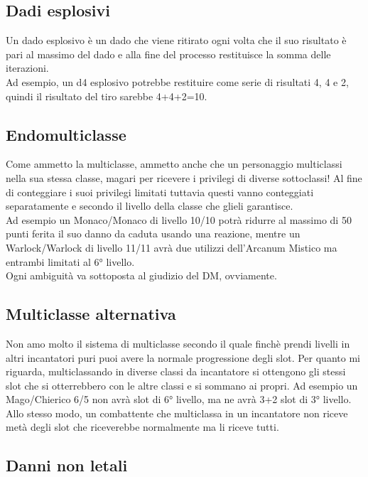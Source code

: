 \subsection{Dadi esplosivi}

Un dado esplosivo è un dado che viene ritirato ogni volta che il suo risultato è pari al massimo del dado e alla fine del processo restituisce la somma delle iterazioni. \\ Ad esempio, un d4 esplosivo potrebbe restituire come serie di risultati 4, 4 e 2, quindi il risultato del tiro sarebbe 4+4+2=10.

\subsection{Endomulticlasse}

Come ammetto la multiclasse, ammetto anche che un personaggio multiclassi nella sua stessa classe, magari per ricevere i privilegi di diverse sottoclassi! Al fine di conteggiare i suoi privilegi limitati tuttavia questi vanno conteggiati separatamente e secondo il livello della classe che glieli garantisce. \\ Ad esempio un Monaco/Monaco di livello 10/10 potrà ridurre al massimo di 50 punti ferita il suo danno da caduta usando una reazione, mentre un Warlock/Warlock di livello 11/11 avrà due utilizzi dell'Arcanum Mistico ma entrambi limitati al 6° livello. \\ Ogni ambiguità va sottoposta al giudizio del DM, ovviamente.

\subsection{Multiclasse alternativa}

Non amo molto il sistema di multiclasse secondo il quale finchè prendi livelli in altri incantatori puri puoi avere la normale progressione degli slot. Per quanto mi riguarda, multiclassando in diverse classi da incantatore si ottengono gli stessi slot che si otterrebbero con le altre classi e si sommano ai propri. Ad esempio un Mago/Chierico 6/5 non avrà slot di 6° livello, ma ne avrà 3+2 slot di 3° livello. Allo stesso modo, un combattente che multiclassa in un incantatore non riceve metà degli slot che riceverebbe normalmente ma li riceve tutti.

\subsection{Danni non letali}

